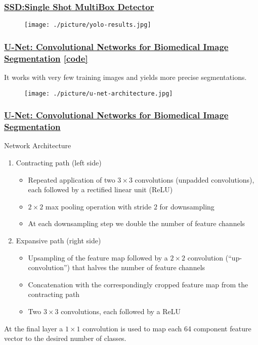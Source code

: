 \documentclass{beamer}
\begin{document}
\begin{frame}
  \frametitle{\href{https://arxiv.org/abs/1512.02325}
    {SSD:Single Shot MultiBox Detector}}
  \begin{figure}[!htb]
    \centering
    \texttt{[image: ./picture/yolo-results.jpg]}
  \end{figure}

\end{frame}  

\begin{frame}
  \frametitle{\href{https://arxiv.org/pdf/1505.04597v1.pdf}
    {U-Net: Convolutional Networks for Biomedical Image Segmentation}
  \href{http://lmb.informatik.uni-freiburg.de/people/ronneber/u-net}{[code]}}
  It works with very few training images and yields more precise segmentations.
  \begin{figure}[!htb]
    \centering
    \texttt{[image: ./picture/u-net-architecture.jpg]}
  \end{figure}

\end{frame}

\begin{frame}
  \frametitle{\href{https://arxiv.org/pdf/1505.04597v1.pdf}
    {U-Net: Convolutional Networks for Biomedical Image Segmentation}}
  Network Architecture
  \begin{enumerate}
  \item Contracting path (left side)
    \begin{itemize}
    \item Repeated application of two $3\times3$ convolutions (unpadded convolutions), each
      followed by a rectified linear unit (ReLU)
    \item $2\times2$ max pooling operation with stride $2$ for downsampling
    \item At each downsampling step we double the number of feature channels
    \end{itemize}
  \item Expansive path (right side)
    \begin{itemize}
    \item Upsampling of the feature map followed by a $2\times2$ convolution (“up-convolution”)
      that halves the number of feature channels
    \item Concatenation with the correspondingly cropped feature map from the contracting path
    \item Two $3\times3$ convolutions, each followed by a ReLU
    \end{itemize}
  \end{enumerate}
  At the final layer a $1\times1$ convolution is used to map each 64 component feature
  vector to the desired number of classes. 

\end{frame}
\end{document}
